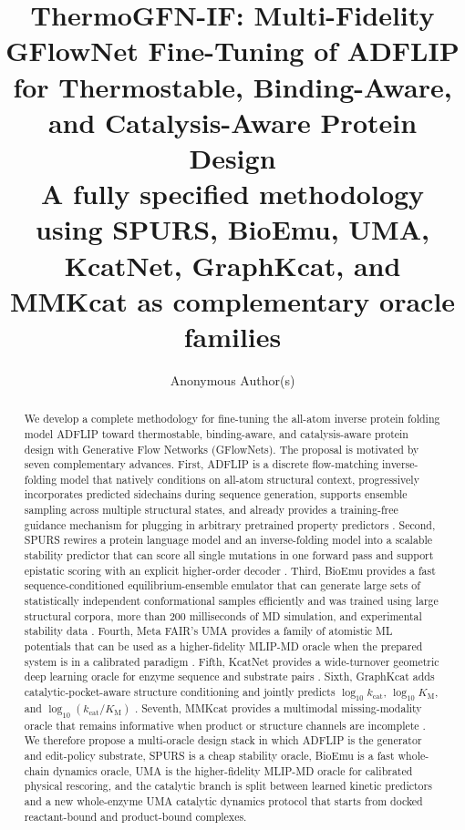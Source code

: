 \documentclass[11pt]{article}
\title{ThermoGFN-IF: Multi-Fidelity GFlowNet Fine-Tuning of ADFLIP for Thermostable, Binding-Aware, and Catalysis-Aware Protein Design\\
	\large A fully specified methodology using SPURS, BioEmu, UMA, KcatNet, GraphKcat, and MMKcat as complementary oracle families}
\author{Anonymous Author(s)}
\date{}
\newcommand{\logkcat}{\ensuremath{\log_{10} k_{\mathrm{cat}}}}
\newcommand{\logKm}{\ensuremath{\log_{10} K_{\mathrm M}}}
\newcommand{\logeff}{\ensuremath{\log_{10}(k_{\mathrm{cat}}/K_{\mathrm M})}}
\begin{document}
	\maketitle
	
	
	
	
	\begin{abstract}
		We develop a complete methodology for fine-tuning the all-atom inverse protein folding model ADFLIP toward thermostable, binding-aware, and catalysis-aware protein design with Generative Flow Networks (GFlowNets). The proposal is motivated by seven complementary advances. First, ADFLIP is a discrete flow-matching inverse-folding model that natively conditions on all-atom structural context, progressively incorporates predicted sidechains during sequence generation, supports ensemble sampling across multiple structural states, and already provides a training-free guidance mechanism for plugging in arbitrary pretrained property predictors \citep{yi2025adflip,campbell2024flowmatchingdiscrete}. Second, SPURS rewires a protein language model and an inverse-folding model into a scalable stability predictor that can score all single mutations in one forward pass and support epistatic scoring with an explicit higher-order decoder \citep{li2026spurs}. Third, BioEmu provides a fast sequence-conditioned equilibrium-ensemble emulator that can generate large sets of statistically independent conformational samples efficiently and was trained using large structural corpora, more than 200 milliseconds of MD simulation, and experimental stability data \citep{lewis2024bioemu}. Fourth, Meta FAIR's UMA provides a family of atomistic ML potentials that can be used as a higher-fidelity MLIP-MD oracle when the prepared system is in a calibrated paradigm \citep{wood2025uma,levine2025omol25,fairchem2025github}. Fifth, KcatNet provides a wide-turnover geometric deep learning oracle for enzyme sequence and substrate pairs \citep{pan2026kcatnet}. Sixth, GraphKcat adds catalytic-pocket-aware structure conditioning and jointly predicts $\logkcat$, $\logKm$, and $\logeff$ \citep{luo2025graphkcat}. Seventh, MMKcat provides a multimodal missing-modality oracle that remains informative when product or structure channels are incomplete \citep{sun2025mmkcat}. We therefore propose a multi-oracle design stack in which ADFLIP is the generator and edit-policy substrate, SPURS is a cheap stability oracle, BioEmu is a fast whole-chain dynamics oracle, UMA is the higher-fidelity MLIP-MD oracle for calibrated physical rescoring, and the catalytic branch is split between learned kinetic predictors and a new whole-enzyme UMA catalytic dynamics protocol that starts from docked reactant-bound and product-bound complexes.
		

\end{abstract}
\end{document}
